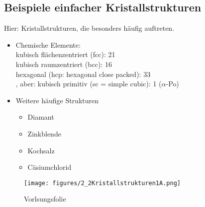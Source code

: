 \subsection{Beispiele einfacher Kristallstrukturen}
\label{kap:2_3}
Hier: Kristallstrukturen, die besonders häufig auftreten.
\begin{itemize}
    \item Chemische Elemente:\\
    kubisch flächenzentriert (fcc): 21\\
    kubisch raumzentriert (bcc): 16\\
    hexagonal (hcp: hexagonal close packed): 33\\
    , aber: kubisch primitiv (sc = simple cubic): 1 ($\alpha$-Po)
    \item Weitere häufige Strukturen
    \begin{itemize}
        \item Diamant
        \item Zinkblende
        \item Kochsalz
        \item Cäsiumchlorid
    \end{itemize}
\end{itemize}
\begin{figure}[H]
    \centering
    \texttt{[image: figures/2\_2Kristallstrukturen1A.png]}
    \caption{Vorlsungsfolie}
    \label{}
\end{figure}
